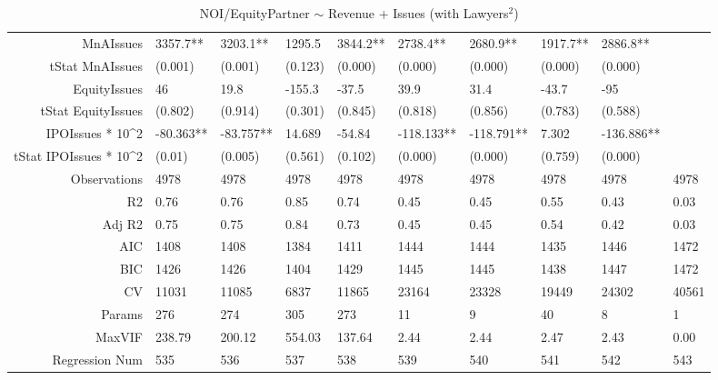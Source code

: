 \begin{table}[ht]
\begin{tabular}{rlllllllll}
  MnAIssues & 3357.7** & 3203.1** & 1295.5 & 3844.2** & 2738.4** & 2680.9** & 1917.7** & 2886.8** &  \\ 
  tStat MnAIssues & (0.001) & (0.001) & (0.123) & (0.000) & (0.000) & (0.000) & (0.000) & (0.000) &  \\ 
  EquityIssues & 46 & 19.8 & -155.3 & -37.5 & 39.9 & 31.4 & -43.7 & -95 &  \\ 
  tStat EquityIssues & (0.802) & (0.914) & (0.301) & (0.845) & (0.818) & (0.856) & (0.783) & (0.588) &  \\ 
  IPOIssues * 10^2 & -80.363** & -83.757** & 14.689 & -54.84 & -118.133** & -118.791** & 7.302 & -136.886** &  \\ 
  tStat IPOIssues * 10^2 & (0.01) & (0.005) & (0.561) & (0.102) & (0.000) & (0.000) & (0.759) & (0.000) &  \\ 
  Observations & 4978 & 4978 & 4978 & 4978 & 4978 & 4978 & 4978 & 4978 & 4978 \\ 
  R2 & 0.76 & 0.76 & 0.85 & 0.74 & 0.45 & 0.45 & 0.55 & 0.43 & 0.03 \\ 
  Adj R2 & 0.75 & 0.75 & 0.84 & 0.73 & 0.45 & 0.45 & 0.54 & 0.42 & 0.03 \\ 
  AIC & 1408 & 1408 & 1384 & 1411 & 1444 & 1444 & 1435 & 1446 & 1472 \\ 
  BIC & 1426 & 1426 & 1404 & 1429 & 1445 & 1445 & 1438 & 1447 & 1472 \\ 
  CV & 11031 & 11085 & 6837 & 11865 & 23164 & 23328 & 19449 & 24302 & 40561 \\ 
  Params & 276 & 274 & 305 & 273 & 11 & 9 & 40 & 8 & 1 \\ 
  MaxVIF & 238.79 & 200.12 & 554.03 & 137.64 & 2.44 & 2.44 & 2.47 & 2.43 & 0.00 \\ 
  Regression Num & 535 & 536 & 537 & 538 & 539 & 540 & 541 & 542 & 543 \\ 
   \hline
\end{tabular}
\caption{NOI/EquityPartner $\sim$ Revenue + Issues (with Lawyers$^2$)} 
\end{table}

